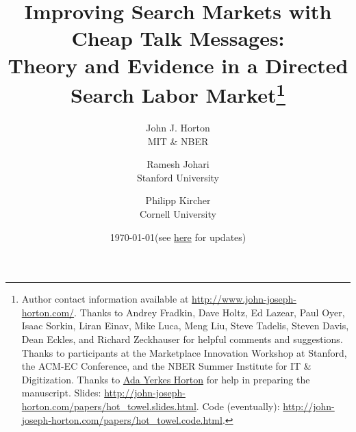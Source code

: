 \documentclass[12pt]{article}
\begin{document}
 

\newcommand{\WorkingTitle}{Improving Search Markets with Cheap Talk Messages:\\
       Theory and Evidence in a Directed Search Labor Market}

\title{\WorkingTitle\footnote{Author contact information available at
     \href{http://www.john-joseph-horton.com/}{http://www.john-joseph-horton.com/}.
     Thanks to Andrey Fradkin,
     Dave Holtz,
     Ed Lazear,
     Paul Oyer,
     Isaac Sorkin,
     Liran Einav,
     Mike Luca,
     Meng Liu,
     Steve Tadelis,
     Steven Davis,
     Dean Eckles, and Richard Zeckhauser for helpful comments and suggestions.
     Thanks to participants at the Marketplace Innovation Workshop at Stanford, the ACM-EC Conference, and the NBER Summer Institute for IT \& Digitization.
     Thanks to \href{https://john-joseph-horton.com/papers/ayh.jpg}{Ada Yerkes Horton} for help in preparing the manuscript.
     Slides: \href{https://john-joseph-horton.com/papers/hot_towel.slides.html}{http://john-joseph-horton.com/papers/hot\_towel.slides.html}.
     Code (eventually): \href{https://john-joseph-horton.com/papers/hot_towel.code.html}{http://john-joseph-horton.com/papers/hot\_towel.code.html}.
}}

\newcommand{\JPEabstract}{
  \noindent
  We develop a theory of cheap talk signaling in matching markets in which employers can announce their preferences, which workers can use to direct their search. 
  In a large online labor market, employers were given the opportunity to state their relative willingness to pay for productivity.
  Preferences were elicited for all firms, but preferences were only revealed to job-seekers for treated firms.
  Job-seekers clearly targeted their applications to employers of the right ``type'' even when they could not observe preferences.
  However, revelation of preferences caused substantial additional sorting.
  This additional sorting strongly affected who was matched to whom, and at what price, implying seekers regarded revealed information as credible \emph{ex ante} commitments. 
  Overall, the treatment raised the average wage bill and the number of hours-worked and likely increased match quality. 
  \newline \newline
}

\date{\today (see \href{http://john-joseph-horton.com/papers/hot_towel_pk.pdf}{\color{blue} here} \color{black} for updates)}

\author{John J. Horton\\MIT \& NBER \and Ramesh Johari\\Stanford University \and Philipp Kircher \\ Cornell University}
\maketitle
\end{document}
